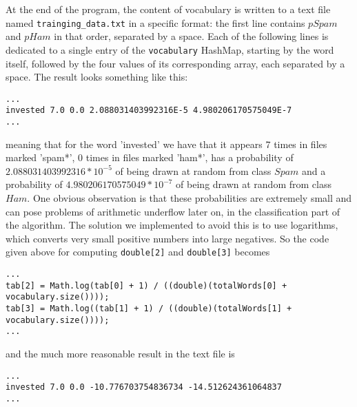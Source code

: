 \documentclass[12pt,a4paper]{report}
\begin{document}
At the end of the program, the content of vocabulary is written to a text file named \texttt{trainging\_data.txt} in a specific format: the first line contains $pSpam$ and $pHam$ in that order, separated by a space. Each of the following lines is dedicated to a single entry of the \texttt{vocabulary} HashMap, starting by the word itself, followed by the four values of its corresponding array, each separated by a space. The result looks something like this: 
\begin{lstlisting}
...
invested 7.0 0.0 2.088031403992316E-5 4.980206170575049E-7 
...
\end{lstlisting}
meaning that for the word 'invested' we have that it appears 7 times in files marked 'spam*', 0 times in files marked 'ham*', has a probability of $2.088031403992316 * 10^{-5}$ of being drawn at random from class $Spam$ and a probability of $4.980206170575049 * 10^{-7}$ of being drawn at random from class $Ham$. One obvious observation is that these probabilities are extremely small and can pose problems of arithmetic underflow later on, in the classification part of the algorithm. The solution we implemented to avoid this is to use logarithms, which converts very small positive numbers into large negatives. So the code given above for computing \texttt{double[2]} and \texttt{double[3]} becomes 

\begin{lstlisting}
...
tab[2] = Math.log(tab[0] + 1) / ((double)(totalWords[0] + vocabulary.size())));
tab[3] = Math.log((tab[1] + 1) / ((double)(totalWords[1] + vocabulary.size())));
...
\end{lstlisting}

and the much more reasonable result in the text file is

\begin{lstlisting}
...
invested 7.0 0.0 -10.776703754836734 -14.512624361064837 
...
\end{lstlisting}
\end{document}
